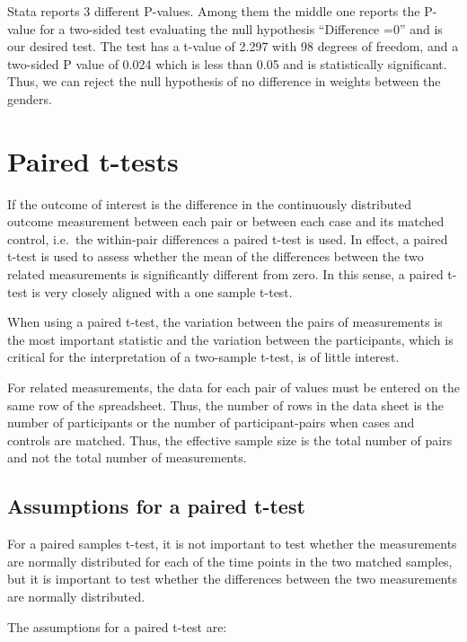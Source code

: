 \documentclass[
]{memoir}
\begin{document}
Stata reports 3 different P-values. Among them the middle one reports the P-value for a two-sided test evaluating the null hypothesis ``Difference =0'' and is our desired test. The test has a t-value of 2.297 with 98 degrees of freedom, and a two-sided P value of 0.024 which is less than 0.05 and is statistically significant. Thus, we can reject the null hypothesis of no difference in weights between the genders.

\hypertarget{paired-t-tests}{%
\section{Paired t-tests}\label{paired-t-tests}}

If the outcome of interest is the difference in the continuously distributed outcome measurement between each pair or between each case and its matched control, i.e.~the within-pair differences a paired t-test is used. In effect, a paired t-test is used to assess whether the mean of the differences between the two related measurements is significantly different from zero. In this sense, a paired t-test is very closely aligned with a one sample t-test.

When using a paired t-test, the variation between the pairs of measurements is the most important statistic and the variation between the participants, which is critical for the interpretation of a two-sample t-test, is of little interest.

For related measurements, the data for each pair of values must be entered on the same row of the spreadsheet. Thus, the number of rows in the data sheet is the number of participants or the number of participant-pairs when cases and controls are matched. Thus, the effective sample size is the total number of pairs and not the total number of measurements.

\hypertarget{assumptions-for-a-paired-t-test}{%
\subsection{Assumptions for a paired t-test}\label{assumptions-for-a-paired-t-test}}

For a paired samples t-test, it is not important to test whether the measurements are normally distributed for each of the time points in the two matched samples, but it is important to test whether the differences between the two measurements are normally distributed.

The assumptions for a paired t-test are:
\end{document}
